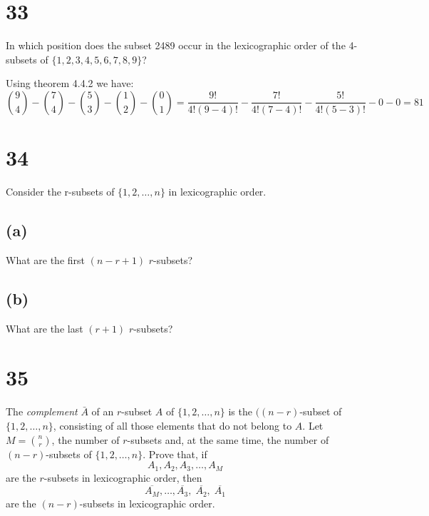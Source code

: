 \documentclass{article}
\begin{document}
\section*{33}
In which position does the subset 2489 occur in the lexicographic order of the 4-subsets of $\{1,2,3,4,5,6,7,8,9\}$?

Using theorem 4.4.2 we have:
\[\binom{9}{4}-\binom{7}{4}-\binom{5}{3}-\binom{1}{2}-\binom{0}{1}=\frac{9!}{4!(9-4)!}-\frac{7!}{4!(7-4)!}-\frac{5!}{4!(5-3)!}-0-0=81\]

\section*{34}
Consider the r-subsets of $\{1,2,\dots,n\}$ in lexicographic order.
\subsection*{(a)}
What are the first $(n-r+1)$ $r$-subsets?
\subsection*{(b)}
What are the last $(r+1)$ $r$-subsets?
\section*{35}
The \emph{complement} $\bar{A}$ of an $r$-subset $A$ of $\{1,2,\dots,n\}$ is the $((n-r)$-subset of $\{1,2,\dots,n\}$, consisting of all those elements that do not belong to $A$. Let $M=\binom{n}{r}$, the number of $r$-subsets and, at the same time, the number of $(n-r)$-subsets of $\{1,2,\dots,n\}$. Prove that, if
\[A_1,A_2,A_3,\dots,A_M\]
are the $r$-subsets in lexicographic order, then
\[\overline{A_M},\dots,\overline{A_3},\;\overline{A_2},\;\overline{A_1}\]
are the $(n-r)$-subsets in lexicographic order.
\end{document}
